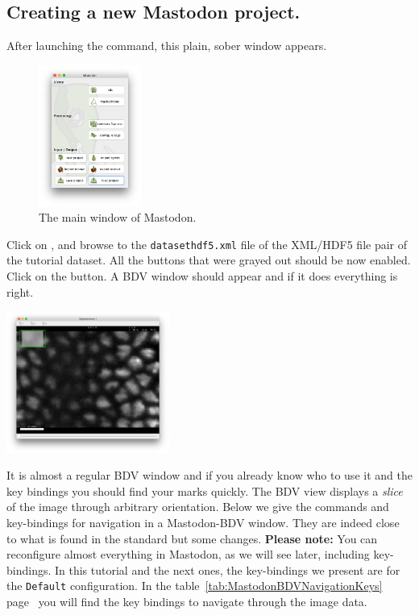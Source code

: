 \subsection{Creating a new Mastodon project.}

After launching the command, this plain, sober window appears.
\begin{figure}[!htbp]
    \centering
    \includegraphics[width=0.3\textwidth]{figures/Mastodon_MainWindow.png}
    \caption{The main window of Mastodon.}
    \label{fig:MastodonMainWindow}
\end{figure}

Click on , and browse to the \texttt{datasethdf5.xml} file of the XML/HDF5 file pair of the tutorial dataset.
All the buttons that were grayed out should be now enabled. 
Click on the  button.
A BDV window should appear and if it does everything is right.
\begin{center}
         \includegraphics[width=0.4\textwidth]{figures/Mastodon_BDV.png}
\end{center}

It is almost a regular BDV window and if you already know who to use it and the key bindings you should find your marks quickly.
The BDV view displays a \textit{slice} of the image through arbitrary orientation. 
Below we give the commands and key-bindings for navigation in a Mastodon-BDV window. 
They are indeed close to what is found in the standard \Bdv but some changes. 
\textbf{Please note:} You can reconfigure almost everything in Mastodon, as we will see later, including key-bindings.
In this tutorial and the next ones, the key-bindings we present are for the \texttt{Default} configuration.
In the table~\ref{tab:MastodonBDVNavigationKeys} page~\pageref{tab:MastodonBDVNavigationKeys} you will find the key bindings to navigate through the image data.

